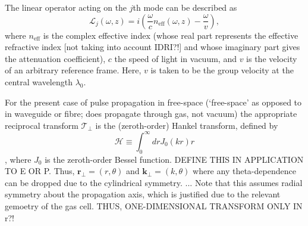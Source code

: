 \documentclass[a4paper]{jpconf}
\begin{document}
The linear operator acting on the $j$th mode can be described as 
\begin{equation}
\mathcal{L}_j(\omega, z) = i \left( \frac{\omega}{c} n_{\text{eff}}(\omega,z) - \frac{\omega}{v} \right),
\end{equation}
where $n_\text{eff}$ is the complex effective index (whose real part represents the effective refractive index [not taking into account IDRI?!] and whose imaginary part gives the attenuation coefficient), $c$ the speed of light in vacuum, and $v$ is the velocity of an arbitrary reference frame. Here, $v$ is taken to be the group velocity at the central wavelength $\lambda_0$. \par 
For the present case of pulse propagation in free-space (`free-space' as opposed to in waveguide or fibre; does propagate through gas, not vacuum) the appropriate reciprocal transform $\mathcal{T}_\perp$ is the (zeroth-order) Hankel transform, defined by
\begin{equation}
\mathcal{H} \equiv \int_0^\infty dr J_0 (kr)r
\end{equation},
where $J_0$ is the zeroth-order Bessel function. DEFINE THIS IN APPLICATION TO E OR P. Thus, $\mathbf{r}_\perp = (r, \theta)$ and $\mathbf{k}_\perp = (k, \theta)$ where any theta-dependence can be dropped due to the cylindrical symmetry. 
...
Note that this assumes radial symmetry about the propagation axis, which is justified due to the relevant gemoetry of the gas cell. THUS, ONE-DIMENSIONAL TRANSFORM ONLY IN r?!
\end{document}
